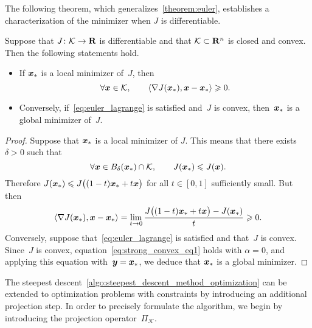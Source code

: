 The following theorem,
which generalizes~\eqref{theorem:euler},
establishes a characterization of the minimizer when $J$ is differentiable.
\begin{theorem}
    \label{theorem:euler_lagrange}
    Suppose that $J\colon \mathcal K \to \mathbf R$ is differentiable and
    that $\mathcal K \subset \mathbf R^n$ is closed and convex.
    Then the following statements hold.
    \begin{itemize}
        \item
            If $\mathbf{\boldsymbol{x}}_*$ is a local minimizer of~$J$,
            then
            \begin{equation}
                \label{eq:euler_lagrange}
                \forall \mathbf{\boldsymbol{x}} \in \mathcal K,
                \qquad \langle\nabla J(\mathbf{\boldsymbol{x}}_*), \mathbf{\boldsymbol{x}} - \mathbf{\boldsymbol{x}}_*\rangle \geqslant 0.
            \end{equation}

        \item
            Conversely, if~\eqref{eq:euler_lagrange} is satisfied and~$J$ is convex,
            then~$\mathbf{\boldsymbol{x}}_*$ is a global minimizer of~$J$.
    \end{itemize}
\end{theorem}
\begin{proof}
    Suppose that $\mathbf{\boldsymbol{x}}_*$ is a local minimizer of $J$.
    This means that there exists~$\delta > 0$ such that
    \[
        \forall \mathbf{\boldsymbol{x}} \in B_{\delta}(\mathbf{\boldsymbol{x}}_*) \cap \mathcal K, \qquad
        J(\mathbf{\boldsymbol{x}}_*) \leqslant J(\mathbf{\boldsymbol{x}}).
    \]
    Therefore $J(\mathbf{\boldsymbol{x}}_*) \leqslant J\bigl((1-t)\mathbf{\boldsymbol{x}}_* + t \mathbf{\boldsymbol{x}}\bigr)$ for all $t \in [0, 1]$ sufficiently small.
    But then
    \[
        \langle\nabla J(\mathbf{\boldsymbol{x}}_*), \mathbf{\boldsymbol{x}} - \mathbf{\boldsymbol{x}}_*\rangle
        = \lim_{t \to 0} \frac{ J\bigl((1-t)\mathbf{\boldsymbol{x}}_* + t \mathbf{\boldsymbol{x}}\bigr)  - J(\mathbf{\boldsymbol{x}}_*)}{t} \geqslant 0.
    \]
    Conversely, suppose that~\eqref{eq:euler_lagrange} is satisfied and that~$J$ is convex.
    Since~$J$ is convex, equation~\eqref{eq:strong_convex_eq1} holds with $\alpha = 0$,
    and applying this equation with~$\mathbf{\boldsymbol{y}} = \mathbf{\boldsymbol{x}}_*$,
    we deduce that $\mathbf{\boldsymbol{x}}_*$ is a global minimizer.
\end{proof}

The steepest descent~\cref{algo:steepest_descent_method_optimization} can be extended to optimization problems with constraints by introducing an additional projection step.
In order to precisely formulate the algorithm,
we begin by introducing the projection operator~$\Pi_{\mathcal K}$.

